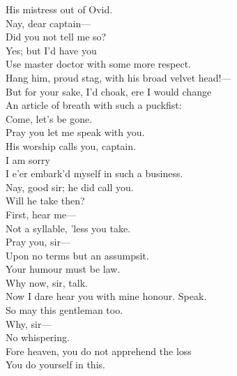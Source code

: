 \documentclass[a4paper,oneside]{memoir}
\begin{document}
\begin{drama*}
His mistress out of Ovid.\\
\dapperspeaks {} Nay, dear captain---\\
\facespeaks Did you not tell me so?\\
\dapperspeaks {} Yes; but I'd have you\\
Use master doctor with some more respect.\\
\facespeaks Hang him, proud stag, with his broad velvet head!---\\
But for your sake, I'd choak, ere I would change\\
An article of breath with such a puckfist:\\
Come, let's be gone.\\
\subtlespeaks {} Pray you let me speak with you.\\
\dapperspeaks His worship calls you, captain.\\
\facespeaks {} I am sorry\\
I e'er embark'd myself in such a business.\\
\dapperspeaks Nay, good sir; he did call you.\\
\facespeaks {} Will he take then?\\
\subtlespeaks First, hear me---\\
\facespeaks {} Not a syllable, 'less you take.\\
\subtlespeaks Pray you, sir---\\
\facespeaks {} Upon no terms but an assumpsit.\\
\subtlespeaks Your humour must be law.\\
\facespeaks {} Why now, sir, talk.\\
Now I dare hear you with mine honour. Speak.\\
So may this gentleman too.\\
\subtlespeaks {} Why, sir---\\
\facespeaks {} No whispering.\\
\subtlespeaks Fore heaven, you do not apprehend the loss\\
You do yourself in this.\\

\end{drama*}
\end{document}
